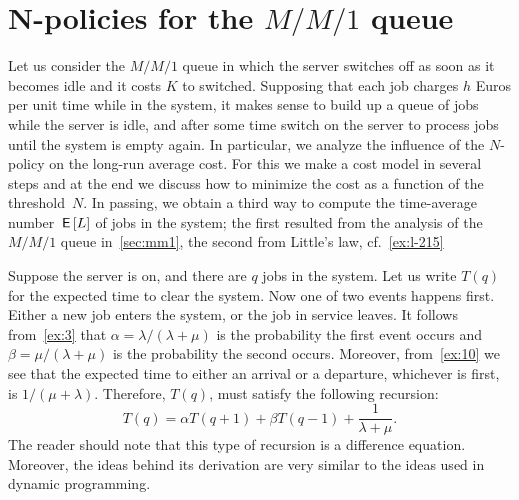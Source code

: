 
\section{N-policies for the $M/M/1$ queue}
\label{sec:n-policies}




Let us consider the $M/M/1$ queue in which the server switches off as soon as it becomes idle and it costs $K$ to switched.
Supposing that each job charges $h$ Euros per unit time while in the system, it makes sense to build up a queue of jobs while the server is idle, and after some time switch on the server to process jobs until the system is empty again.
In particular, we analyze the influence of the $N$-policy on the long-run average cost.
For this we make a cost model in several steps and at the end we discuss how to minimize the cost as a function of the threshold~$N$.
In passing, we obtain a third way to compute the time-average number $\,\mathsf{E}\left[L\right]$ of jobs in the system; the first resulted from the analysis of the $M/M/1$ queue in~\cref{sec:mm1}, the second from Little's law, cf.~\cref{ex:l-215}

Suppose the server is on, and there are $q$ jobs in the system.
Let us write $T(q)$ for the expected time to clear the system.
Now one of two events happens first.
Either a new job enters the system, or the job in service leaves.
It follows from~\cref{ex:3} that $\alpha=\lambda/(\lambda+\mu)$ is the probability the first event occurs and $\beta=\mu/(\lambda+\mu)$ is the probability the second occurs.
Moreover, from~\cref{ex:10} we see that the expected time to either an arrival or a departure, whichever is first, is $1/(\mu+\lambda)$.
Therefore, $T(q)$, must satisfy the following recursion:
\begin{equation}
  \label{eq:92}
  T(q) = \alpha T(q+1) + \beta T(q-1) + \frac{1}{\lambda+\mu}. 
\end{equation}
The reader should note that this type of recursion is a difference equation.
Moreover, the ideas behind its derivation are very similar to the ideas used in dynamic programming.


